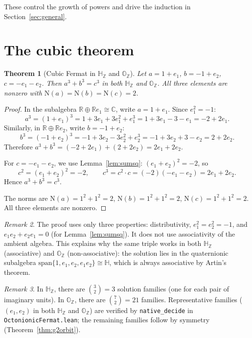 \documentclass[11pt]{amsart}
\theoremstyle{plain}
\newtheorem{theorem}{Theorem}[section]
\theoremstyle{definition}
\theoremstyle{remark}
\newtheorem{remark}[theorem]{Remark}
\newcommand{\Z}{\mathbb{Z}}
\newcommand{\R}{\mathbb{R}}
\newcommand{\C}{\mathbb{C}}
\newcommand{\HH}{\mathbb{H}}
\newcommand{\OO}{\mathbb{O}}
\newcommand{\Norm}[1]{\mathrm{N}(#1)}
\begin{document}
These control the growth of powers and drive the induction
in Section~\ref{sec:general}.


\section{The cubic theorem}\label{sec:cubic}

\begin{theorem}[Cubic Fermat in $\HH_\Z$ and $\OO_\Z$]\label{thm:cubic}
Let $a = 1 + e_1$, $b = -1 + e_2$, $c = -e_1 - e_2$. Then
$a^3 + b^3 = c^3$ in both $\HH_\Z$ and $\OO_\Z$.
All three elements are nonzero with $\Norm{a} = \Norm{b} = \Norm{c} = 2$.
\end{theorem}

\begin{proof}
In the subalgebra $\R \oplus \R e_1 \cong \C$, write $a = 1 + e_1$.
Since $e_1^2 = -1$:
\[
  a^3 = (1 + e_1)^3 = 1 + 3e_1 + 3e_1^2 + e_1^3
      = 1 + 3e_1 - 3 - e_1 = -2 + 2e_1.
\]
Similarly, in $\R \oplus \R e_2$, write $b = -1 + e_2$:
\[
  b^3 = (-1 + e_2)^3 = -1 + 3e_2 - 3e_2^2 + e_2^3
      = -1 + 3e_2 + 3 - e_2 = 2 + 2e_2.
\]
Therefore $a^3 + b^3 = (-2 + 2e_1) + (2 + 2e_2) = 2e_1 + 2e_2$.

For $c = -e_1 - e_2$, we use Lemma~\ref{lem:sumsq}: $(e_1 + e_2)^2 = -2$, so
\[
  c^2 = (e_1 + e_2)^2 = -2,
  \qquad
  c^3 = c^2 \cdot c = (-2)(-e_1 - e_2) = 2e_1 + 2e_2.
\]
Hence $a^3 + b^3 = c^3$.

The norms are $\Norm{a} = 1^2 + 1^2 = 2$, $\Norm{b} = 1^2 + 1^2 = 2$,
$\Norm{c} = 1^2 + 1^2 = 2$.
All three elements are nonzero.
\end{proof}

\begin{remark}\label{rem:cubic-hypotheses}
The proof uses only three properties: distributivity, $e_1^2 = e_2^2 = -1$,
and $e_1 e_2 + e_2 e_1 = 0$ (for Lemma~\ref{lem:sumsq}).
It does not use associativity of the ambient algebra.
This explains why the same triple works in both $\HH_\Z$ (associative) and $\OO_\Z$
(non-associative): the solution lies in the quaternionic subalgebra
$\mathrm{span}\{1, e_1, e_2, e_1 e_2\} \cong \HH$, which is always associative
by Artin's theorem.
\end{remark}

\begin{remark}
In $\HH_\Z$, there are $\binom{3}{2} = 3$ solution families (one for each pair of imaginary units).
In $\OO_\Z$, there are $\binom{7}{2} = 21$ families.
Representative families ($(e_1, e_2)$ in both $\HH_\Z$ and $\OO_\Z$) are verified
by \texttt{native\_decide} in \texttt{OctonionicFermat.lean};
the remaining families follow by symmetry (Theorem~\ref{thm:g2orbit}).
\end{remark}
\end{document}

